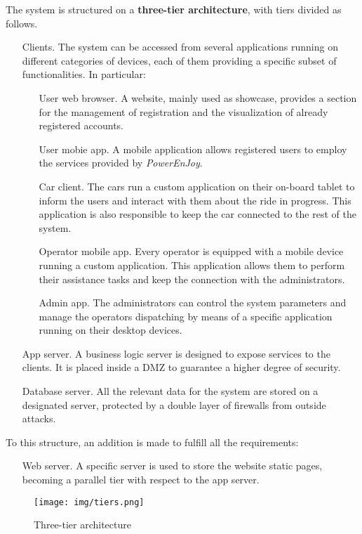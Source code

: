 The system is structured on a \textbf{three-tier architecture}, with tiers divided as follows.
\begin{itemize}
	\item[Clients.] The system can be accessed from several applications running on different categories of devices, each of them providing a specific subset of functionalities. In particular:
	\begin{itemize}
		\item[User web browser.] A website, mainly used as showcase, provides a section for the management of registration and the visualization of already registered accounts.
		\item[User mobie app.] A mobile application allows registered users to employ the services provided by \textit{PowerEnJoy}.
		\item[Car client.] The cars run a custom application on their on-board tablet to inform the users and interact with them about the ride in progress. This application is also responsible to keep the car connected to the rest of the system.
		\item[Operator mobile app.] Every operator is equipped with a mobile device running a custom application. This application allows them to perform their assistance tasks and keep the connection with the administrators.
		\item[Admin app.] The administrators can control the system parameters and manage the operators dispatching by means of a specific application running on their desktop devices.
	\end{itemize}
	\item[App server.] A business logic server is designed to expose services to the clients. It is placed inside a DMZ to guarantee a higher degree of security.
	\item[Database server.] All the relevant data for the system are stored on a designated server, protected by a double layer of firewalls from outside attacks.
\end{itemize}
To this structure, an addition is made to fulfill all the requirements:
	\begin{itemize}
		\item[Web server.] A specific server is used to store the website static pages, becoming a parallel tier with respect to the app server.
	\end{itemize}

\begin{figure}[h]
	\texttt{[image: img/tiers.png]} %
	\caption{Three-tier architecture}
\end{figure}
\FloatBarrier

